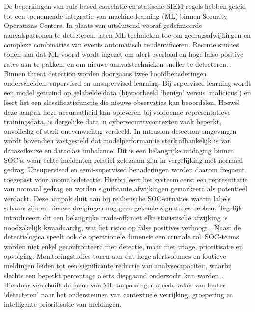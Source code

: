 De beperkingen van rule-based correlatie en statische SIEM-regels hebben geleid tot een toenemende integratie van machine learning (ML) binnen Security Operations Centers. In plaats van uitsluitend vooraf gedefinieerde aanvalspatronen te detecteren, laten ML-technieken toe om gedragsafwijkingen en complexe combinaties van events automatisch te identificeren. Recente studies tonen aan dat ML vooral wordt ingezet om alert overload en hoge false positive rates aan te pakken, en om nieuwe aanvalstechnieken sneller te detecteren. \autocite{Upadhyay2025}.
\newline
\newline
Binnen threat detection worden doorgaans twee hoofdbenaderingen onderscheiden: supervised en unsupervised learning. Bij supervised learning wordt een model getraind op gelabelde data (bijvoorbeeld ‘benign’ versus ‘malicious’) en leert het een classificatiefunctie die nieuwe observaties kan beoordelen. Hoewel deze aanpak hoge accuraatheid kan opleveren bij voldoende representatieve trainingsdata, is dergelijke data in cybersecuritycontexten vaak beperkt, onvolledig of sterk onevenwichtig verdeeld. In intrusion detection-omgevingen wordt bovendien vastgesteld dat modelperformantie sterk afhankelijk is van datasetkeuze en dataclass imbalance. Dit is een belangrijke uitdaging binnen SOC’s, waar echte incidenten relatief zeldzaam zijn in vergelijking met normaal gedrag.
\newline
\newline
Unsupervised en semi-supervised benaderingen worden daarom frequent toegepast voor anomaliedetectie. Hierbij leert het systeem eerst een representatie van normaal gedrag en worden significante afwijkingen gemarkeerd als potentieel verdacht. Deze aanpak sluit aan bij realistische SOC-situaties waarin labels schaars zijn en nieuwe dreigingen nog geen gekende signatures hebben. Tegelijk introduceert dit een belangrijke trade-off: niet elke statistische afwijking is noodzakelijk kwaadaardig, wat het risico op false positives verhoogt \autocite{Upadhyay2025}.
\newline
\newline
Naast de detectielogica speelt ook de operationele dimensie een cruciale rol. SOC-teams worden niet enkel geconfronteerd met detectie, maar met triage, prioritisatie en opvolging. Monitoringstudies tonen aan dat hoge alertvolumes en foutieve meldingen leiden tot een significante reductie van analysecapaciteit, waarbij slechts een beperkt percentage alerts diepgaand onderzocht kan worden \autocite{Sivakumaran2025}. Hierdoor verschuift de focus van ML-toepassingen steeds vaker van louter ‘detecteren’ naar het ondersteunen van contextuele verrijking, groepering en intelligente prioritisatie van meldingen.
